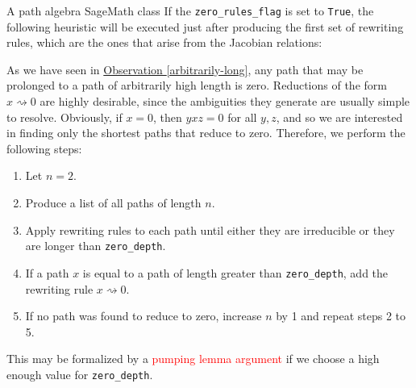 \begin{chapter}{A path algebra SageMath class}
If the \texttt{zero\_rules\_flag} is set to \texttt{True}, the following heuristic will be executed just after producing the first set of rewriting rules, which are the ones that arise from the Jacobian relations:
\begin{heur} As we have seen in \hyperref[arbitrarily-long]{Observation \ref*{arbitrarily-long}},  any path that may be prolonged to a path of arbitrarily high length is zero. Reductions of the form $x\rightsquigarrow 0$ are highly desirable, since the ambiguities they generate are usually simple to resolve. Obviously, if $x=0$, then $yxz=0$ for all $y,z$, and so we are interested in finding only the shortest paths that reduce to zero. Therefore, we perform the following steps:
\begin{enumerate}
\item Let $n=2$.
\item Produce a list of all paths of length $n$.
\item Apply rewriting rules to each path until either they are irreducible or they are longer than \texttt{zero\_depth}.
\item If a path $x$ is equal to a path of length greater than \texttt{zero\_depth}, add the rewriting rule $x\rightsquigarrow 0$.
\item If no path was found to reduce to zero, increase $n$ by 1 and repeat steps 2 to 5.
\end{enumerate}
This may be formalized by a \textcolor{red}{pumping lemma argument} if we choose a high enough value for \texttt{zero\_depth}.
\end{heur}


\end{chapter}
